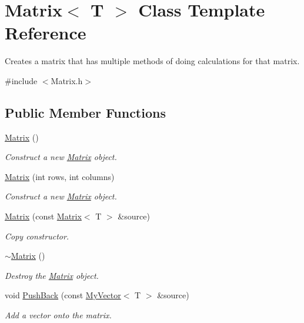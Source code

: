 \hypertarget{class_matrix}{}\section{Matrix$<$ T $>$ Class Template Reference}
\label{class_matrix}


Creates a matrix that has multiple methods of doing calculations for that matrix.  




{\ttfamily \#include $<$Matrix.\+h$>$}

\subsection*{Public Member Functions}
\begin{DoxyCompactItemize}
\item 
\mbox{\hyperlink{class_matrix_a9d567e3a121b1be0c3f9c461cab524fe}{Matrix}} ()
\begin{DoxyCompactList}\small\item\em Construct a new \mbox{\hyperlink{class_matrix}{Matrix}} object. \end{DoxyCompactList}\item 
\mbox{\hyperlink{class_matrix_a44eb4cf3a243fe027112d1ace474ead9}{Matrix}} (int rows, int columns)
\begin{DoxyCompactList}\small\item\em Construct a new \mbox{\hyperlink{class_matrix}{Matrix}} object. \end{DoxyCompactList}\item 
\mbox{\hyperlink{class_matrix_abc1e84ee28720ecc8a6807bb3f09f43e}{Matrix}} (const \mbox{\hyperlink{class_matrix}{Matrix}}$<$ T $>$ \&source)
\begin{DoxyCompactList}\small\item\em Copy constructor. \end{DoxyCompactList}\item 
\mbox{\hyperlink{class_matrix_a91aa704de674203e96aece9e1955ccd3}{$\sim$\+Matrix}} ()
\begin{DoxyCompactList}\small\item\em Destroy the \mbox{\hyperlink{class_matrix}{Matrix}} object. \end{DoxyCompactList}\item 
void \mbox{\hyperlink{class_matrix_af61aaa671b6bd354b27fb3aabbb65a9d}{Push\+Back}} (const \mbox{\hyperlink{class_my_vector}{My\+Vector}}$<$ T $>$ \&source)
\begin{DoxyCompactList}\small\item\em Add a vector onto the matrix. \end{DoxyCompactList}\item 

\end{DoxyCompactItemize}

